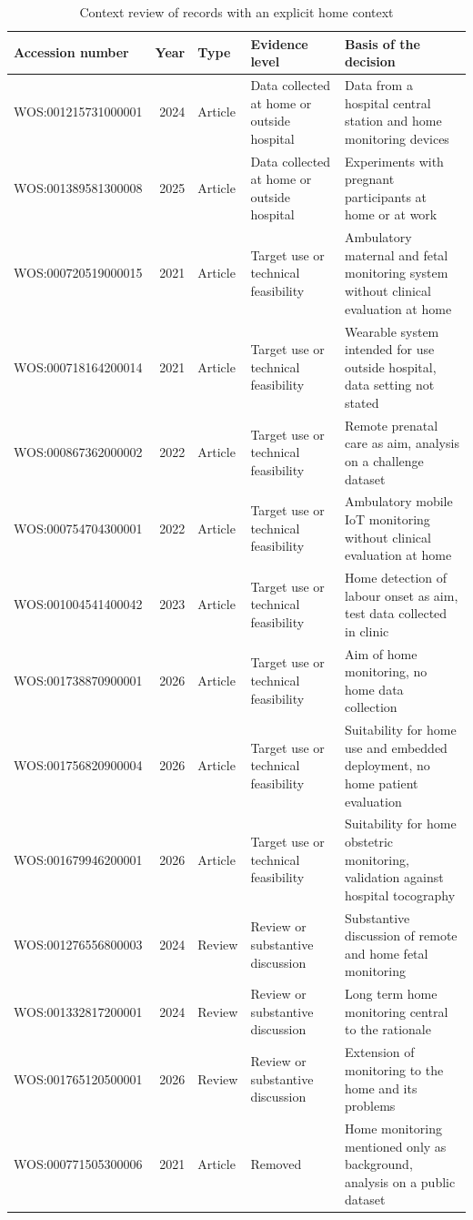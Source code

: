 \begin{table}[!ht]
\caption{Context review of records with an explicit home context}
\centering
\footnotesize
\begin{tabularx}{\textwidth}{@{}L{3.6cm}rlL{3.9cm}Y@{}}
\toprule
Accession number & Year & Type & Evidence level & Basis of the decision \\
\midrule
WOS:001215731000001 & 2024 & Article & Data collected at home or outside hospital & Data from a hospital central station and home monitoring devices \\
WOS:001389581300008 & 2025 & Article & Data collected at home or outside hospital & Experiments with pregnant participants at home or at work \\
WOS:000720519000015 & 2021 & Article & Target use or technical feasibility & Ambulatory maternal and fetal monitoring system without clinical evaluation at home \\
WOS:000718164200014 & 2021 & Article & Target use or technical feasibility & Wearable system intended for use outside hospital, data setting not stated \\
WOS:000867362000002 & 2022 & Article & Target use or technical feasibility & Remote prenatal care as aim, analysis on a challenge dataset \\
WOS:000754704300001 & 2022 & Article & Target use or technical feasibility & Ambulatory mobile IoT monitoring without clinical evaluation at home \\
WOS:001004541400042 & 2023 & Article & Target use or technical feasibility & Home detection of labour onset as aim, test data collected in clinic \\
WOS:001738870900001 & 2026 & Article & Target use or technical feasibility & Aim of home monitoring, no home data collection \\
WOS:001756820900004 & 2026 & Article & Target use or technical feasibility & Suitability for home use and embedded deployment, no home patient evaluation \\
WOS:001679946200001 & 2026 & Article & Target use or technical feasibility & Suitability for home obstetric monitoring, validation against hospital tocography \\
WOS:001276556800003 & 2024 & Review & Review or substantive discussion & Substantive discussion of remote and home fetal monitoring \\
WOS:001332817200001 & 2024 & Review & Review or substantive discussion & Long term home monitoring central to the rationale \\
WOS:001765120500001 & 2026 & Review & Review or substantive discussion & Extension of monitoring to the home and its problems \\
WOS:000771505300006 & 2021 & Article & Removed & Home monitoring mentioned only as background, analysis on a public dataset \\
\bottomrule
\end{tabularx}
\end{table}
